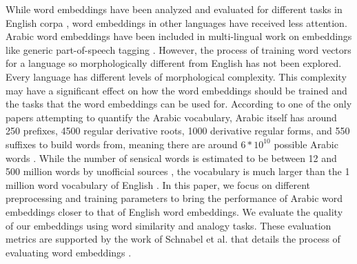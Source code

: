While word embeddings have been analyzed and evaluated for different tasks in English corpa \cite{mikoloveffic:2013,dos2014deep}, word embeddings in other languages have received less attention. Arabic word embeddings have been included in multi-lingual work on embeddings like generic part-of-speech tagging \cite{al:2013}. However, the process of training word vectors for a language so morphologically different from English has not been explored. Every language has different levels of morphological complexity. This complexity may have a significant effect on how the word embeddings should be trained and the tasks that the word embeddings can be used for. According to one of the only papers attempting to quantify the Arabic vocabulary, Arabic itself has around 250 prefixes, 4500 regular derivative roots, 1000 derivative regular forms, and 550 suffixes to build words from, meaning there are around $6*10^{10}$ possible Arabic words \cite{ahmed2000alarge}. While the number of sensical words is estimated to be between 12 and 500 million words by unofficial sources \cite{Lameen:2013,Muhammad:2015}, the vocabulary is much larger than the 1 million word vocabulary of English \cite{Googl96:online}. In this paper, we focus on different preprocessing and training parameters to bring the performance of Arabic word embeddings closer to that of English word embeddings. We evaluate the quality of our embeddings using word similarity and analogy tasks. These evaluation metrics are supported by the work of Schnabel et al. that details the process of evaluating word embeddings \cite{schnabel2015evaluation}.
\\
